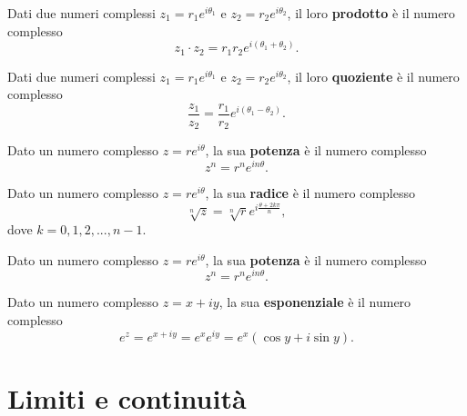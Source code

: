 \documentclass{book}
\begin{document}
\begin{theorem}
    Dati due numeri complessi \( z_1 = r_1 e^{i\theta_1} \) e \( z_2 = r_2 e^{i\theta_2} \), il loro \textbf{prodotto} è il numero complesso
    \[ z_1 \cdot z_2 = r_1 r_2 e^{i(\theta_1 + \theta_2)}. \]
\end{theorem}
\begin{theorem}
    Dati due numeri complessi \( z_1 = r_1 e^{i\theta_1} \) e \( z_2 = r_2 e^{i\theta_2} \), il loro \textbf{quoziente} è il numero complesso
    \[ \frac{z_1}{z_2} = \frac{r_1}{r_2} e^{i(\theta_1 - \theta_2)}. \]
\end{theorem}

\begin{theorem}
    Dato un numero complesso \( z = r e^{i\theta} \), la sua \textbf{potenza} è il numero complesso
    \[ z^n = r^n e^{i n \theta}. \]
\end{theorem}
\begin{theorem}
    Dato un numero complesso \( z = r e^{i\theta} \), la sua \textbf{radice} è il numero complesso
    \[ \sqrt[n]{z} = \sqrt[n]{r} e^{i \frac{\theta + 2k\pi}{n}}, \]
    dove \( k = 0, 1, 2, ..., n - 1 \).
\end{theorem}
\begin{theorem}
    Dato un numero complesso \( z = r e^{i\theta} \), la sua \textbf{potenza} è il numero complesso
    \[ z^n = r^n e^{i n \theta}. \]
\end{theorem}
\begin{definition}
    Dato un numero complesso \( z = x + iy \), la sua \textbf{esponenziale} è il numero complesso
    \[ e^z = e^{x + iy} = e^x e^{iy} = e^x (\cos y + i \sin y). \]
\end{definition}

\chapter{Limiti e continuità}
\end{document}
